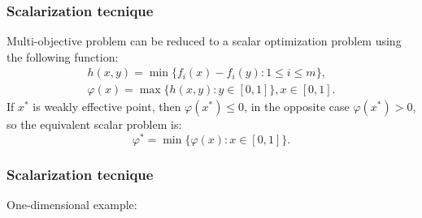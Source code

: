 \documentclass[aspectratio=1610]{beamer}
\begin{document}
\begin{frame}
  \frametitle{Scalarization tecnique}
  Multi-objective problem can be reduced to a scalar optimization problem using the following function:
  \begin{eqnarray*}
    h(x,y)=\min\{f_i(x)-f_i(y):1\leqslant i\leqslant m\}, \\
    \varphi(x)=\max\{h(x,y):y\in [0,1]\},x\in [0,1].
  \end{eqnarray*}
If \(x^*\) is weakly effective point, then \(\varphi(x^*)\le 0\), in the opposite case \(\varphi(x^*)> 0\), so
the equivalent scalar problem is:
  \begin{displaymath}
    \varphi^*=\min\{\varphi(x):x\in [0,1]\}.
  \end{displaymath}
\end{frame}

\begin{frame}
  \frametitle{Scalarization tecnique}
  One-dimensional example:
  \begin{figure}
  \end{figure}
\end{frame}
\end{document}
